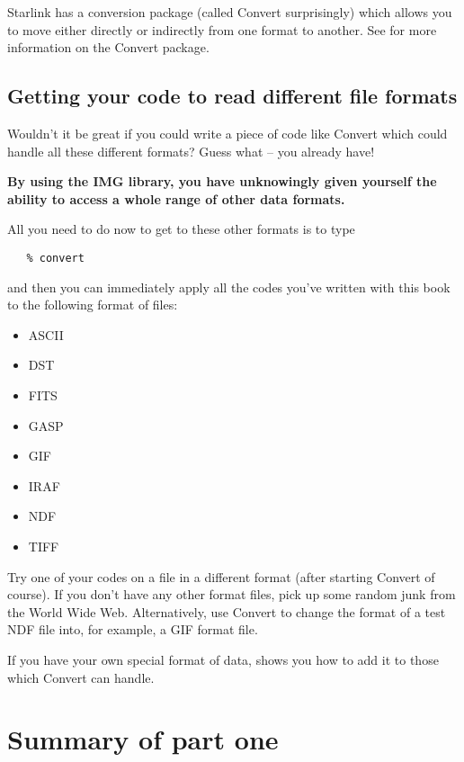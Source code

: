Starlink has a conversion package (called Convert surprisingly) which
allows you to move either directly or indirectly from one format to another.
See  for more information on the Convert
package.

\subsection{Getting your code to read different file formats}

Wouldn't it be great if you could write a piece of code like Convert
which could handle all these different formats? Guess what -- you already
have!

{\bf By using the IMG library, you have unknowingly given yourself the
ability to access a whole range of other data formats.}

\noindent
All you need to do now to get to these other formats is to type

\begin{verbatim}
   % convert
\end{verbatim}

and then you can immediately apply all the codes you've written with this
book to the following format of files:

\begin{itemize}
\item ASCII
\item DST
\item FITS
\item GASP
\item GIF
\item IRAF
\item NDF
\item TIFF
\end{itemize}

Try one of your codes on a file in a different format (after starting
Convert of course). If you don't have any other format files, pick up some
random junk from the World Wide Web. Alternatively, use Convert to change
the format of a test NDF file into, for example, a GIF format file.

If you have your own special format of data, 
shows you how to add it to those which Convert can handle.

\section{Summary of part one}

